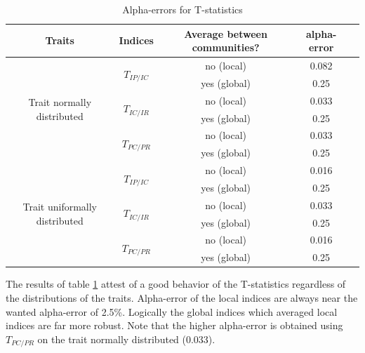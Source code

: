 \documentclass[12pt]{article}\usepackage[]{graphicx}\usepackage[]{color}
\begin{document}
\begin{table}[h!]
\begin{center}
\caption{Alpha-errors for T-statistics}
\label{tab:Alpha-errors_for_T-stats}
\begin{tabular}{|c|c|c|c|c|}
\hline
Traits & Indices & Average between communities? & alpha-error \tabularnewline
\hline \hline \hline
\multirow{6}{*}{Trait normally distributed} & \multirow{2}{*}{$T_{IP/IC}$} & no (local) & 0.082 \tabularnewline
\cline{3-4} 
 & & yes (global) & 0.25 \tabularnewline
\cline{2-4} 
 & \multirow{2}{*}{$T_{IC/IR}$} & no (local) & 0.033 \tabularnewline
\cline{3-4} 
 & & yes (global) & 0.25 \tabularnewline
\cline{2-4} 
 & \multirow{2}{*}{$T_{PC/PR}$} & no (local) & 0.033 \tabularnewline
\cline{3-4}
 & & yes (global)& 0.25 \tabularnewline

\hline \hline \hline

\multirow{6}{*}{Trait uniformally distributed} & \multirow{2}{*}{$T_{IP/IC}$} & no (local) & 0.016 \tabularnewline
\cline{3-4}
 & & yes (global) &  0.25 \tabularnewline
\cline{2-4} 
 & \multirow{2}{*}{$T_{IC/IR}$} & no (local) & 0.033 \tabularnewline
\cline{3-4} 
 & & yes (global) &  0.25 \tabularnewline
\cline{2-4} 
 & \multirow{2}{*}{$T_{PC/PR}$} & no (local) & 0.016 \tabularnewline
\cline{3-4} 
 & & yes (global)&  0.25 \tabularnewline
\hline 
\end{tabular}
\end{center}
\end{table}



The results of table \ref{tab:Alpha-errors_for_T-stats} attest of a good behavior of the T-statistics regardless of the distributions of the traits. Alpha-error of the local indices are always near the wanted alpha-error of 2.5\%. Logically the global indices which averaged local indices are far more robust. Note that the higher alpha-error is obtained using $T_{PC/PR}$ on the trait normally distributed (0.033).
\end{document}
